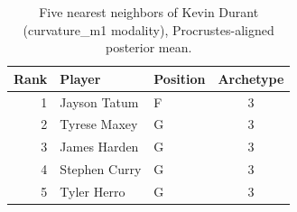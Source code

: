 \begin{table}[htbp]
  \centering\small
  \begin{tabular}{rllc}
    \toprule
    Rank & Player & Position & Archetype \\
    \midrule
    1 & Jayson Tatum & F & 3 \\
    2 & Tyrese Maxey & G & 3 \\
    3 & James Harden & G & 3 \\
    4 & Stephen Curry & G & 3 \\
    5 & Tyler Herro & G & 3 \\
    \bottomrule
  \end{tabular}
  \caption{Five nearest neighbors of Kevin Durant (curvature_m1 modality), Procrustes-aligned posterior mean.}
  \label{tab:Kevin_Durant_neighbors_curvature_m1}
\end{table}

